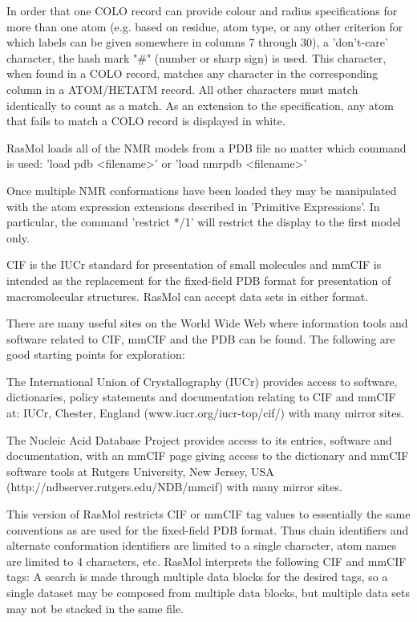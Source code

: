 In order that one COLO record can provide colour and radius
specifications for more than one atom (e.g. based on residue, atom
type, or any other criterion for which labels can be given somewhere in
columns 7 through 30), a 'don't-care' character, the hash mark "#"
(number or sharp sign) is used. This character, when found in a COLO
record, matches any character in the corresponding column in a
ATOM/HETATM record. All other characters must match identically to count
as a match. As an extension to the specification, any atom that fails
to match a COLO record is displayed in white.

RasMol loads all of the NMR models from a PDB file no matter which
command is used:
'load pdb <filename>'
or
'load nmrpdb <filename>'

Once multiple NMR conformations have been loaded they may be
manipulated with the atom expression extensions described in
'Primitive Expressions'.
In particular, the command
'restrict */1'
will restrict the display to the first model only.

CIF is the IUCr standard for presentation of small molecules and mmCIF
is intended as the replacement for the fixed-field PDB format for
presentation of macromolecular structures. RasMol can accept data sets
in either format.

There are many useful sites on the World Wide Web where information
tools and software related to CIF, mmCIF and the PDB can be found. The
following are good starting points for exploration:

The International Union of Crystallography (IUCr) provides access to
software, dictionaries, policy statements and documentation relating to
CIF and mmCIF at: IUCr, Chester, England (www.iucr.org/iucr-top/cif/)
with many mirror sites.

The Nucleic Acid Database Project provides access to its entries,
software and documentation, with an mmCIF page giving access to the
dictionary and mmCIF software tools at Rutgers University, New Jersey,
USA (http://ndbserver.rutgers.edu/NDB/mmcif) with many mirror sites.

This version of RasMol restricts CIF or mmCIF tag values to essentially
the same conventions as are used for the fixed-field PDB format. Thus
chain identifiers and alternate conformation identifiers are limited to
a single character, atom names are limited to 4 characters, etc. RasMol
interprets the following CIF and mmCIF tags:
A search is made through multiple data blocks for the desired tags, so
a single dataset may be composed from multiple data blocks, but
multiple data sets may not be stacked in the same file.

